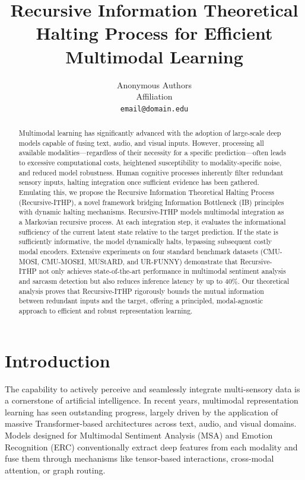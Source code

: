\documentclass[11pt]{article}
\title{Recursive Information Theoretical Halting Process for Efficient Multimodal Learning}
\author{Anonymous Authors \\
  Affiliation \\
  \texttt{email@domain.edu} \\}
\begin{document}
\maketitle

\begin{abstract}
Multimodal learning has significantly advanced with the adoption of large-scale deep models capable of fusing text, audio, and visual inputs. However, processing all available modalities—regardless of their necessity for a specific prediction—often leads to excessive computational costs, heightened susceptibility to modality-specific noise, and reduced model robustness. Human cognitive processes inherently filter redundant sensory inputs, halting integration once sufficient evidence has been gathered. Emulating this, we propose the Recursive Information Theoretical Halting Process (Recursive-ITHP), a novel framework bridging Information Bottleneck (IB) principles with dynamic halting mechanisms. Recursive-ITHP models multimodal integration as a Markovian recursive process. At each integration step, it evaluates the informational sufficiency of the current latent state relative to the target prediction. If the state is sufficiently informative, the model dynamically halts, bypassing subsequent costly modal encoders. Extensive experiments on four standard benchmark datasets (CMU-MOSI, CMU-MOSEI, MUStARD, and UR-FUNNY) demonstrate that Recursive-ITHP not only achieves state-of-the-art performance in multimodal sentiment analysis and sarcasm detection but also reduces inference latency by up to 40\%. Our theoretical analysis proves that Recursive-ITHP rigorously bounds the mutual information between redundant inputs and the target, offering a principled, modal-agnostic approach to efficient and robust representation learning.
\end{abstract}

\section{Introduction}
The capability to actively perceive and seamlessly integrate multi-sensory data is a cornerstone of artificial intelligence. In recent years, multimodal representation learning has seen outstanding progress, largely driven by the application of massive Transformer-based architectures \citep{vaswani2017attention} across text, audio, and visual domains. Models designed for Multimodal Sentiment Analysis (MSA) and Emotion Recognition (ERC) conventionally extract deep features from each modality and fuse them through mechanisms like tensor-based interactions, cross-modal attention, or graph routing.
\end{document}
